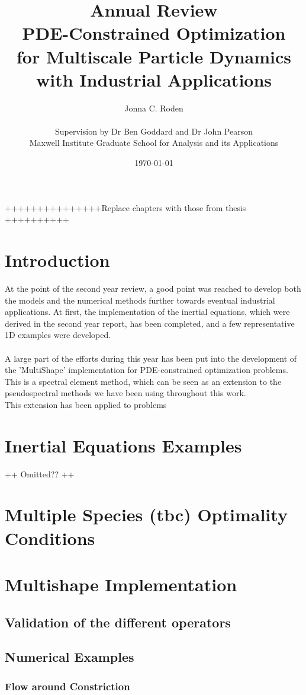 \documentclass[11pt, a4paper]{article}
\title{{\huge Annual Review \\ PDE-Constrained Optimization \\for Multiscale Particle Dynamics} \\ with Industrial Applications}
\author{Jonna C. Roden\\ \\Supervision by Dr Ben Goddard and Dr John Pearson\\ \vspace{0.5cm} Maxwell Institute Graduate School for Analysis and its Applications}
\date{\today}
\theoremstyle{definition}
\begin{document}
	+++++++++++++++Replace chapters with those from thesis ++++++++++
	\section{Introduction}
	At the point of the second year review, a good point was reached to develop both the models and the numerical methods further towards eventual industrial applications. 
	At first, the implementation of the inertial equations, which were derived in the second year report, has been completed, and a few representative 1D examples were developed.\\
	\\
	A large part of the efforts during this year has been put into the development of the 'MultiShape' implementation for PDE-constrained optimization problems. This is a spectral element method, which can be seen as an extension to the pseudospectral methods we have been using throughout this work.\\
	This extension has been applied to problems 
	
	\section{Inertial Equations Examples}
	++ Omitted?? ++
	
	\section{Multiple Species (tbc) Optimality Conditions}
	
	
	\section{Multishape Implementation}
	\subsection{Validation of the different operators}
	\subsection{Numerical Examples}
	\subsubsection{Flow around Constriction}
	
\end{document}
